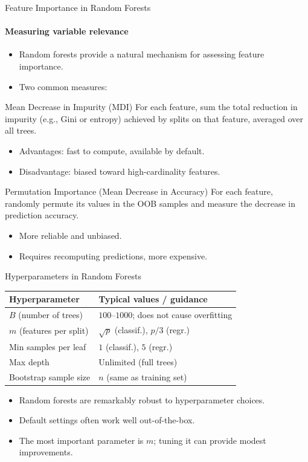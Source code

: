 \begin{frame}{Feature Importance in Random Forests}
  \framesubtitle{Measuring variable relevance}
  \begin{itemize}
    \item Random forests provide a natural mechanism for assessing \alert{feature importance}.
    \item Two common measures:
  \end{itemize}
  \begin{block}{Mean Decrease in Impurity (MDI)}
    For each feature, sum the total reduction in impurity (e.g., Gini or entropy) achieved
    by splits on that feature, averaged over all trees.
    \begin{itemize}
      \item Advantages: fast to compute, available by default.
      \item Disadvantage: biased toward high-cardinality features.
    \end{itemize}
  \end{block}
  \begin{block}{Permutation Importance (Mean Decrease in Accuracy)}
    For each feature, randomly permute its values in the OOB samples and measure the
    decrease in prediction accuracy.
    \begin{itemize}
      \item More reliable and unbiased.
      \item Requires recomputing predictions, more expensive.
    \end{itemize}
  \end{block}
\end{frame}

\begin{frame}{Hyperparameters in Random Forests}
  \renewcommand{\arraystretch}{1.4}
  \begin{center}
  \begin{tabular}{ll}
    \toprule
    \textbf{Hyperparameter} & \textbf{Typical values / guidance} \\
    \midrule
    $B$ (number of trees) & $100$--$1000$; does not cause overfitting \\
    $m$ (features per split) & $\sqrt{p}$ (classif.), $p/3$ (regr.) \\
    Min samples per leaf & $1$ (classif.), $5$ (regr.) \\
    Max depth & Unlimited (full trees) \\
    Bootstrap sample size & $n$ (same as training set) \\
    \bottomrule
  \end{tabular}
  \end{center}
  \vspace{0.4em}
  \begin{itemize}
    \item Random forests are remarkably \alert{robust to hyperparameter choices}.
    \item Default settings often work well out-of-the-box.
    \item The most important parameter is $m$; tuning it can provide modest improvements.
  \end{itemize}
\end{frame}


